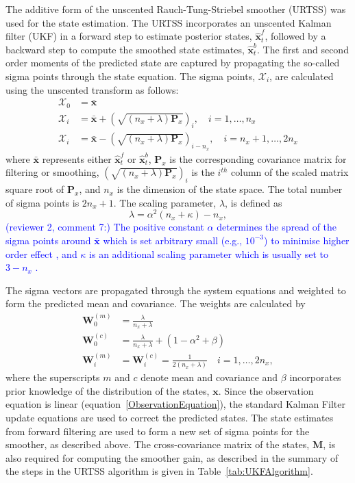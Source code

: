 \documentclass[review,authoryear,3p]{elsarticle}
\newcommand{\parham}[1]{\textcolor{blue}{#1}}
\begin{document}
The additive form of the unscented Rauch-Tung-Striebel smoother (URTSS) \citep{Sarkka2010} was used for the state estimation. The URTSS incorporates an unscented Kalman filter (UKF) \citep{Julier1997, Merwe2003} in a forward step to estimate posterior states, $\hat{\mathbf x}_t^{f}$, followed by a backward step to compute the smoothed state estimates, $\hat{\mathbf x}_t^{b}$. The first and second order moments of the predicted state are captured by propagating the so-called sigma points through the state equation. The sigma points, $\mathcal X_i$, are calculated using the unscented transform as follows:
\begin{align}\label{eq:sigmapoints1}
	\mathcal X_{0}&=\mathbf{\bar x} \\
	\mathcal X_{i}&= \mathbf{\bar x}+\left(\sqrt{( n_x + \lambda)\mathbf P_x}\right)_i, \quad i=1, \dots, n_x \\
	\mathcal X_{i}&=\mathbf{\bar x}-\left(\sqrt{( n_x + \lambda)\mathbf P_x}\right)_{i- n_x}, \quad i= n_x+1, \dots, 2n_x 
\end{align}
where $\mathbf{\bar x}$ represents either $\hat{\mathbf x}_t^{f}$ or $\hat{\mathbf x}_t^{b}$, $\mathbf{P}_x$ is the corresponding covariance matrix for filtering or smoothing, $\left(\sqrt{( n_x + \lambda)\mathbf P_x}\right)_i$ is the $i^{th}$ column of the scaled matrix square root of $\mathbf P_x$, and $n_x$ is the dimension of the state space. The total number of sigma points is $2n_x+1$. The scaling parameter, $\lambda$, is defined as 
\begin{equation}\label{eq:sigmapoints3}
	\lambda=\alpha^2( n_x+\kappa) - n_x, 
\end{equation}
\parham{(reviewer 2, comment 7:) The positive constant $\alpha$ determines the spread of the sigma points around $\mathbf{\bar x}$ which is set arbitrary small (e.g., $10^{-3}$) to minimise higher order effect \citep{Haykin2001} , and  $\kappa$ is an additional scaling parameter which is usually set to $3-n_x$ \citep{Julier2002a}.}


The sigma vectors are propagated through the system equations and weighted to form the predicted mean and covariance. The weights are calculated by 
\begin{align}
	\mathbf W_0^{(m)}&=\frac{\lambda}{ n_x+\lambda} \\
	\mathbf W_0^{(c)}&=\frac{\lambda}{ n_x+\lambda}+(1-\alpha^2+\beta) \\
	\mathbf W_i^{(m)}&=\mathbf W_i^{(c)}=\frac{1}{2( n_x+\lambda)} \quad i=1, \dots, 2n_x, 
\end{align}
where the superscripts $m$ and $c$ denote mean and covariance and $\beta$ incorporates prior knowledge of the distribution of the states, $\mathbf{x}$. Since the observation equation is linear (equation~\ref{ObservationEquation}), the standard Kalman Filter update equations are used to correct the predicted states. The state estimates from forward filtering are used to form a new set of sigma points for the smoother, as described above. The cross-covariance matrix of the states, $\mathbf M$, is also required for computing the smoother gain, as described in the summary of the steps in the URTSS algorithm is given in Table~\ref{tab:UKFAlgorithm}.
\end{document}
